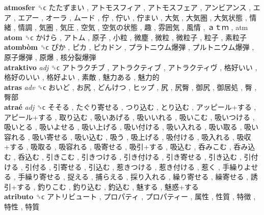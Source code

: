 \textbf{atmosfer} ␝ϲ   たたずまい ,  アトモスフィア ,  アトモスフェア ,  アンビアンス ,  エア ,  エアー ,  オーラ ,  ムード ,  佇 ,  佇い ,  佇まい ,  大気 ,  大気圏 ,  大気状態 ,  情緒 ,  情調 ,  気圏 ,  気圧 ,  空気 ,  空気の状態 ,  趣 ,  雰囲気 ,  風情 ,  ａｔｍ , atm  \\
\textbf{atom} ␝ϲ   かけら ,  アトム ,  原子 ,  小粒 ,  微塵 ,  微粒 ,  微粒子 ,  粒子 ,  素粒子   \\
\textbf{atombòm} ␝ϲ   ぴか ,  ピカ ,  ピカドン ,  プラトニウム爆弾 ,  プルトニウム爆弾 ,  原子爆弾 ,  原爆 ,  核分裂爆弾   \\
\textbf{atraktivo} \emph{adj}  ␝ϲ   アトラクチブ ,  アトラクティブ ,  アトラクティヴ ,  格好いい ,  格好のいい ,  格好よい ,  素敵 ,  魅力ある ,  魅力的   \\
\textbf{atras} \emph{adv}  ␝ϲ   おいど ,  お尻 ,  どんけつ ,  ヒップ ,  尻 ,  尻臀 ,  御尻 ,  御居処 ,  臀 ,  臀部   \\
\textbf{atraé} \emph{adj}  ␝ϲ   そそる ,  たぐり寄せる ,  つり込む ,  とり込む ,  アッピール+する ,  アピール+する ,  取り込む ,  吸いあげる ,  吸いいれる ,  吸いこむ ,  吸いつける ,  吸いとる ,  吸いよせる ,  吸い上げる ,  吸い付ける ,  吸い入れる ,  吸い取る ,  吸い容れる ,  吸い寄せる ,  吸い込む ,  吸う ,  吸上げる ,  吸付ける ,  吸入れる ,  吸収+する ,  吸取る ,  吸容れる ,  吸寄せる ,  吸引+する ,  吸込む ,  呑みこむ ,  呑み込む ,  呑込む ,  引きこむ ,  引きつける ,  引き付ける ,  引き寄せる ,  引き込む ,  引付ける ,  引付る ,  引寄せる ,  引込む ,  惹きつける ,  惹き付ける ,  惹く ,  手繰りよせる ,  手繰り寄せる ,  捉える ,  捕らえる ,  採り入れる ,  繰り寄せる ,  繰寄せる ,  誘引+する ,  釣りこむ ,  釣り込む ,  釣込む ,  魅する ,  魅惑+する   \\
\textbf{atributo} ␝ϲ   アトリビュート ,  プロパティ ,  プロパティー ,  属性 ,  性質 ,  特徴 ,  特性 ,  特質   \\
